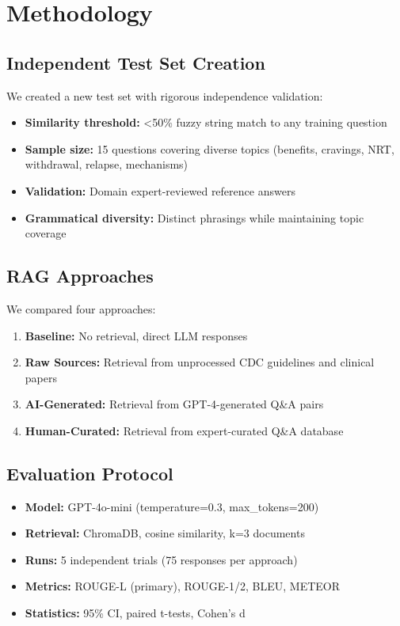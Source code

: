 \documentclass[11pt]{article}
\begin{document}
\section{Methodology}

\subsection{Independent Test Set Creation}

We created a new test set with rigorous independence validation:

\begin{itemize}
    \item \textbf{Similarity threshold:} <50\% fuzzy string match to any training question
    \item \textbf{Sample size:} 15 questions covering diverse topics (benefits, cravings, NRT, withdrawal, relapse, mechanisms)
    \item \textbf{Validation:} Domain expert-reviewed reference answers
    \item \textbf{Grammatical diversity:} Distinct phrasings while maintaining topic coverage
\end{itemize}

\subsection{RAG Approaches}

We compared four approaches:

\begin{enumerate}
    \item \textbf{Baseline:} No retrieval, direct LLM responses
    \item \textbf{Raw Sources:} Retrieval from unprocessed CDC guidelines and clinical papers
    \item \textbf{AI-Generated:} Retrieval from GPT-4-generated Q\&A pairs
    \item \textbf{Human-Curated:} Retrieval from expert-curated Q\&A database
\end{enumerate}

\subsection{Evaluation Protocol}

\begin{itemize}
    \item \textbf{Model:} GPT-4o-mini (temperature=0.3, max\_tokens=200)
    \item \textbf{Retrieval:} ChromaDB, cosine similarity, k=3 documents
    \item \textbf{Runs:} 5 independent trials (75 responses per approach)
    \item \textbf{Metrics:} ROUGE-L (primary), ROUGE-1/2, BLEU, METEOR
    \item \textbf{Statistics:} 95\% CI, paired t-tests, Cohen's d
\end{itemize}
\end{document}
